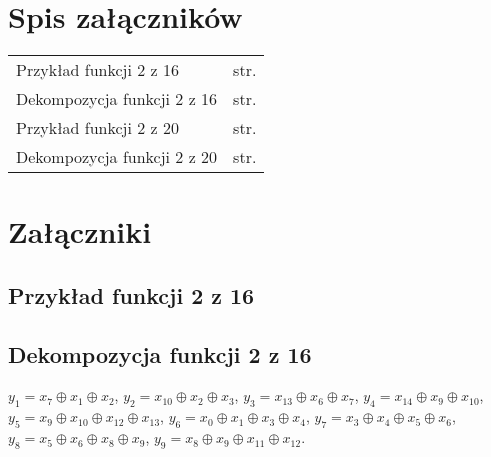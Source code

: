 \chapter*{Spis załączników}
\noindent

\begin{tabularx}{\textwidth}{Xl}

Przykład funkcji 2 z 16 & str. \pageref{file:2outof16.pla} \\
Dekompozycja funkcji 2 z 16 & str. \pageref{file:2outof16.txt} \\

Przykład funkcji 2 z 20 & str. \pageref{file:2outof20.pla} \\
Dekompozycja funkcji 2 z 20 & str. \pageref{file:2outof20.txt} \\
\end{tabularx}

\chapter*{Załączniki}

\section*{Przykład funkcji 2 z 16}
\label{file:2outof16.pla}

\clearpage

\section*{Dekompozycja funkcji 2 z 16}
\label{file:2outof16.txt}
\noindent
$y_1 = x_7 \oplus x_1 \oplus x_2$, \newline
$y_2 = x_10 \oplus x_2 \oplus x_3$, \newline
$y_3 = x_13 \oplus x_6 \oplus x_7$, \newline
$y_4 = x_14 \oplus x_9 \oplus x_10$, \newline
$y_5 = x_9 \oplus x_10 \oplus x_12 \oplus x_13$, \newline
$y_6 = x_0 \oplus x_1 \oplus x_3 \oplus x_4$, \newline
$y_7 = x_3 \oplus x_4 \oplus x_5 \oplus x_6$, \newline
$y_8 = x_5 \oplus x_6 \oplus x_8 \oplus x_9$, \newline
$y_9 = x_8 \oplus x_9 \oplus x_11 \oplus x_12$. \newline

\clearpage

